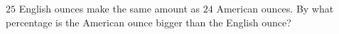 $25$ English ounces make the same amount as $24$ American ounces. By what percentage is the American ounce bigger than the English ounce?
